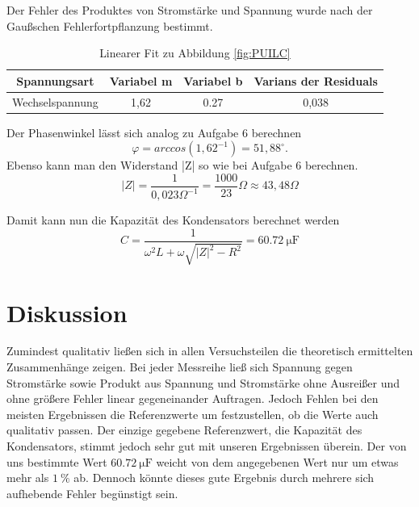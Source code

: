 Der Fehler des Produktes von Stromstärke und Spannung wurde nach der Gaußschen Fehlerfortpflanzung bestimmt.
\begin{table}[H]
  \centering
  \begin{tabular}{c | c | c | c}
    Spannungsart & Variabel m & Variabel b & Varians der Residuals\\ \hline
    Wechselspannung & 1,62 & 0.27 & 0,038
  \end{tabular}
  \caption{Linearer Fit zu Abbildung \ref{fig:PUILC}}
  \label{tab:fitPUILC}
\end{table}
Der Phasenwinkel lässt sich analog zu Aufgabe 6 berechnen
\begin{equation}
\varphi=arccos(1,62^{-1})=51,88^{\circ}.
\end{equation}
Ebenso kann man den Widerstand |Z| so wie bei Aufgabe 6 berechnen.
\begin{equation}
|Z|=\frac{1}{0,023\Omega^{-1}}=\frac{1000}{23}\Omega\approx 43,48\Omega
\end{equation}

Damit kann nun die Kapazität des Kondensators berechnet werden
\begin{equation}
C=\frac{1}{\omega^2L+\omega\sqrt{|Z|^2-R^2}}=\SI{60.72}{\micro\farad}
\end{equation}
\section{Diskussion}
Zumindest qualitativ ließen sich in allen Versuchsteilen die theoretisch ermittelten Zusammenhänge zeigen. Bei jeder Messreihe ließ sich Spannung gegen Stromstärke sowie Produkt aus Spannung und Stromstärke ohne Ausreißer und ohne größere Fehler linear gegeneinander Auftragen. Jedoch Fehlen bei den meisten Ergebnissen die Referenzwerte um festzustellen, ob die Werte auch qualitativ passen. Der einzige gegebene Referenzwert, die Kapazität des Kondensators, stimmt jedoch sehr gut mit unseren Ergebnissen überein. Der von uns bestimmte Wert $ \SI{60.72}{\micro\farad} $ weicht von dem angegebenen Wert nur um etwas mehr als $ \SI{1}{\percent} $ ab. Dennoch könnte dieses gute Ergebnis durch mehrere sich aufhebende Fehler begünstigt sein.
